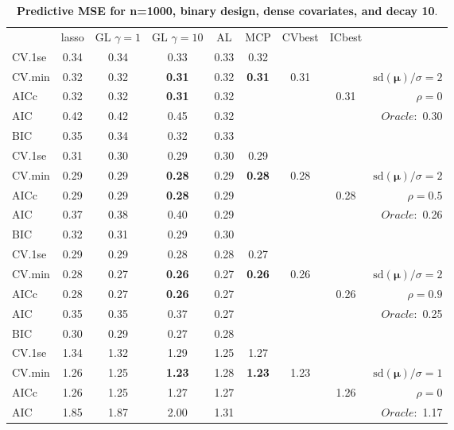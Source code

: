 \clearpage
\begin{table}\vspace{-.5cm}
\caption[l]{ { \bf Predictive MSE for n=1000, binary design, 
dense covariates, and  decay  10}.}
\vspace{-.5cm}
\footnotesize{}
\begin{center}
\begin{tabular}{l*{7}{c}|r}
 & lasso & GL $\gamma=1$ & GL $\gamma=10$ & AL & MCP  & CVbest & ICbest  \\
\cline{1-9}
CV.1se & 0.34 & 0.34 & 0.33 & 0.33 & 0.32 & & & \\
CV.min & 0.32 & 0.32 & {\bf 0.31} & 0.32 & {\bf 0.31} & 0.31 & & $\mathrm{sd}(\mathbf{\mu})/\sigma=2$ \\
AICc & 0.32 & 0.32 & {\bf 0.31} & 0.32 & & & 0.31 &  $\rho=0$ \\
AIC & 0.42 & 0.42 & 0.45 & 0.32 & & & &  \multirow{2}{*}{$Oracle: $ 0.30} \\
BIC & 0.35 & 0.34 & 0.32 & 0.33 & & & &  \\
 \hline 
CV.1se & 0.31 & 0.30 & 0.29 & 0.30 & 0.29 & & & \\
CV.min & 0.29 & 0.29 & {\bf 0.28} & 0.29 & {\bf 0.28} & 0.28 & & $\mathrm{sd}(\mathbf{\mu})/\sigma=2$ \\
AICc & 0.29 & 0.29 & {\bf 0.28} & 0.29 & & & 0.28 &  $\rho=0.5$ \\
AIC & 0.37 & 0.38 & 0.40 & 0.29 & & & &  \multirow{2}{*}{$Oracle: $ 0.26} \\
BIC & 0.32 & 0.31 & 0.29 & 0.30 & & & &  \\
 \hline 
CV.1se & 0.29 & 0.29 & 0.28 & 0.28 & 0.27 & & & \\
CV.min & 0.28 & 0.27 & {\bf 0.26} & 0.27 & {\bf 0.26} & 0.26 & & $\mathrm{sd}(\mathbf{\mu})/\sigma=2$ \\
AICc & 0.28 & 0.27 & {\bf 0.26} & 0.27 & & & 0.26 &  $\rho=0.9$ \\
AIC & 0.35 & 0.35 & 0.37 & 0.27 & & & &  \multirow{2}{*}{$Oracle: $ 0.25} \\
BIC & 0.30 & 0.29 & 0.27 & 0.28 & & & &  \\
 \hline 
CV.1se & 1.34 & 1.32 & 1.29 & 1.25 & 1.27 & & & \\
CV.min & 1.26 & 1.25 & {\bf 1.23} & 1.28 & {\bf 1.23} & 1.23 & & $\mathrm{sd}(\mathbf{\mu})/\sigma=1$ \\
AICc & 1.26 & 1.25 & 1.27 & 1.27 & & & 1.26 &  $\rho=0$ \\
AIC & 1.85 & 1.87 & 2.00 & 1.31 & & & &  \multirow{2}{*}{$Oracle: $ 1.17} \\

\end{tabular}
\end{center}
\end{table}
